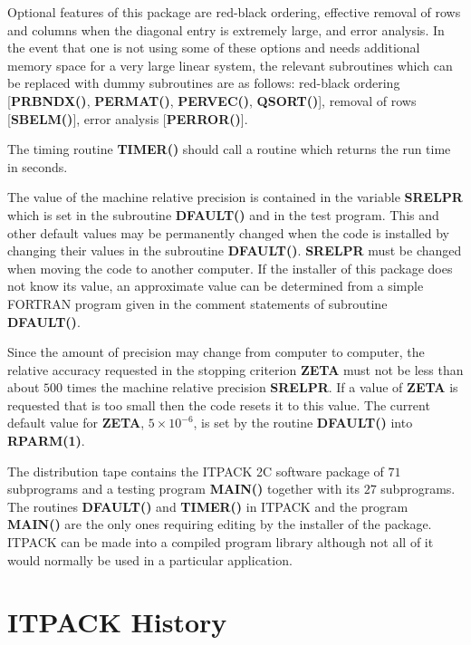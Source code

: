 Optional features of this package are red-black ordering, effective
removal of rows and columns when the diagonal entry is extremely large,
and error analysis.  In the event that one is not using some of these
options and needs additional memory space for a very large linear
system, the relevant subroutines which can be replaced with dummy
subroutines are as follows:  red-black ordering [{\bf PRBNDX()},
{\bf PERMAT()}, {\bf PERVEC()}, {\bf QSORT()}], removal of rows 
[{\bf SBELM()}], error analysis [{\bf PERROR()}].
 
The timing routine {\bf TIMER()} should call a routine which returns 
the run time in seconds.
 
The value of the machine relative precision is contained in the
variable {\bf SRELPR} which is set in the subroutine {\bf DFAULT()} 
and in the test program.  This and other default values may be 
permanently changed when the code is installed by changing their 
values in the subroutine {\bf DFAULT()}.  {\bf SRELPR} must be changed 
when moving the code to another computer.  If the installer of this 
package does not know its value, an approximate value can be determined 
from a simple FORTRAN program given in the comment statements of 
subroutine {\bf DFAULT()}.
 
Since the amount of precision may change from computer to computer,
the relative accuracy requested in the stopping criterion {\bf ZETA} 
must not be less than about $500$ times the machine relative precision 
{\bf SRELPR}.  If a value of {\bf ZETA} is requested that is too small 
then the code resets it to this value.  The current default value for 
{\bf ZETA}, $5 \times 10^{-6}$, is set by the routine {\bf DFAULT()} 
into {\bf RPARM(1)}.
 
The distribution tape contains the ITPACK 2C software package of $71$
subprograms and a testing program {\bf MAIN()} together with its $27$
subprograms.  The routines {\bf DFAULT()} and {\bf TIMER()}  
in ITPACK and the program {\bf MAIN()} are the only ones requiring 
editing by the installer of the package.  ITPACK can be made into
a compiled program library although not all of it would normally
be used in a particular application.
 
\section{ITPACK History}
\label{history}
 
